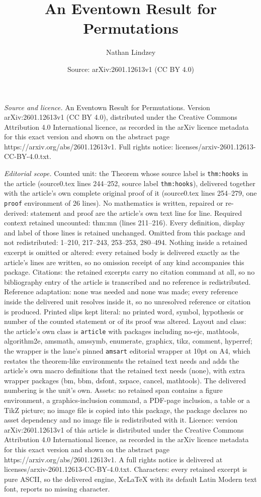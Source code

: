 \documentclass[10pt,a4paper]{amsart}
\title[An Eventown Result for Permutations]{An Eventown Result for Permutations}
\author{Nathan Lindzey}
\date{Source: arXiv:2601.12613v1 (CC BY 4.0)}
\begin{document}
\maketitle

\noindent\emph{Source and licence.} An Eventown Result for Permutations. Version arXiv:2601.12613v1 (CC BY 4.0), distributed under the Creative Commons Attribution 4.0 International licence, as recorded in the arXiv licence metadata for this exact version and shown on the abstract page https://arxiv.org/abs/2601.12613v1. Full rights notice: licenses/arxiv-2601.12613-CC-BY-4.0.txt.\par\smallskip

\noindent\textit{Editorial scope.} Counted unit: the Theorem whose source label is \texttt{thm:hooks} in the article (source0.tex lines 244--252, source label \texttt{thm:hooks}), delivered together with the article's own complete original proof of it (source0.tex lines 254--279, one \texttt{proof} environment of 26 lines). No mathematics is written, repaired or re-derived: statement and proof are the article's own text line for line. Required context retained uncounted: thm:mn (lines 211--216). Every definition, display and label of those lines is retained unchanged. Omitted from this package and not redistributed: 1--210, 217--243, 253--253, 280--494. Nothing inside a retained excerpt is omitted or altered: every retained body is delivered exactly as the article's lines are written, so no omission receipt of any kind accompanies this package. Citations: the retained excerpts carry no citation command at all, so no bibliography entry of the article is transcribed and no reference is redistributed. Reference adaptation: none was needed and none was made; every reference inside the delivered unit resolves inside it, so no unresolved reference or citation is produced. Printed slips kept literal: no printed word, symbol, hypothesis or number of the counted statement or of its proof was altered. Layout and class: the article's own class is \texttt{article} with packages including no-ejc, mathtools, algorithm2e, amsmath, amssymb, enumerate, graphicx, tikz, comment, hyperref; the wrapper is the lane's pinned \texttt{amsart} editorial wrapper at 10pt on A4, which restates the theorem-like environments the retained text needs and adds the article's own macro definitions that the retained text needs (none), with extra wrapper packages (bm, bbm, dsfont, xspace, cancel, mathtools). The delivered numbering is the unit's own. Assets: no retained span contains a figure environment, a graphics-inclusion command, a PDF-page inclusion, a table or a TikZ picture; no image file is copied into this package, the package declares no asset dependency and no image file is redistributed with it. Licence: version arXiv:2601.12613v1 of this article is distributed under the Creative Commons Attribution 4.0 International licence, as recorded in the arXiv licence metadata for this exact version and shown on the abstract page https://arxiv.org/abs/2601.12613v1. A full rights notice is delivered at licenses/arxiv-2601.12613-CC-BY-4.0.txt. Characters: every retained excerpt is pure ASCII, so the delivered engine, XeLaTeX with its default Latin Modern text font, reports no missing character.
\end{document}
